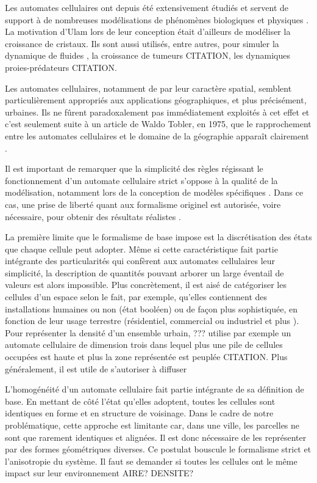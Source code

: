 \documentclass[10pt]{article}
\begin{document}
\begin{multicols}{2}
Les automates cellulaires ont depuis été extensivement étudiés et
servent de support à de nombreuses modélisations de phénomènes
biologiques et physiques \cite{Ganguly}. La motivation d'Ulam lors de
leur conception était d'ailleurs de modéliser la croissance de
cristaux. Ils sont aussi utilisés, entre autres, pour simuler la
dynamique de fluides \cite{Frisch1986}, la croissance de tumeurs
CITATION, les dynamiques proies-prédateurs CITATION.

Les automates cellulaires, notamment de par leur caractère spatial,
semblent particulièrement appropriés aux applications géographiques,
et plus précisément, urbaines. Ils ne fûrent paradoxalement pas
immédiatement exploités à cet effet et c'est seulement suite à un
article de Waldo Tobler, en 1975, que le rapprochement entre les
automates cellulaires et le domaine de la géographie apparaît
clairement \cite{Tobler1975}.

Il est important de remarquer que la simplicité des règles régissant
le fonctionnement d'un automate cellulaire strict s'oppose à la
qualité de la modélisation, notamment lors de la conception de modèles
spécifiques \cite{Torrens2001}. Dans ce cas, une prise de liberté
quant aux formalisme originel est autorisée, voire nécessaire, pour
obtenir des résultats réalistes \cite{White1998}.

La première limite que le formalisme de base impose est la
discrétisation des états que chaque cellule peut adopter. Même si
cette caractéristique fait partie intégrante des particularités qui
confèrent aux automates cellulaires leur simplicité, la description de
quantités pouvant arborer un large éventail de valeurs est alors
impossible. Plus concrètement, il est aisé de catégoriser les cellules
d'un espace selon le fait, par exemple, qu'elles contiennent des
installations humaines ou non (état booléen)
\cite{Benguigui2004,Cornu} ou de façon plus sophistiquée, en fonction
de leur usage terrestre (résidentiel, commercial ou industriel
\cite{Lechner} et plus \cite{Dubos-Paillard203}). Pour représenter la
densité d'un ensemble urbain, ??? utilise par exemple un automate
cellulaire de dimension trois dans lequel plus une pile de cellules
occupées est haute et plus la zone représentée est peuplée
CITATION. Plus généralement, il est utile de s'autoriser à diffuser

L'homogénéité d'un automate cellulaire fait partie intégrante de sa
définition de base. En mettant de côté l'état qu'elles adoptent,
toutes les cellules sont identiques en forme et en structure de
voisinage. Dans le cadre de notre problématique, cette approche est
limitante car, dans une ville, les parcelles ne sont que rarement
identiques et alignées. Il est donc nécessaire de les représenter par
des formes géométriques diverses. Ce postulat bouscule le formalisme
strict et l'anisotropie du système. Il faut se demander si toutes les
cellules ont le même impact sur leur environnement AIRE? DENSITE?


\end{multicols}
\end{document}
